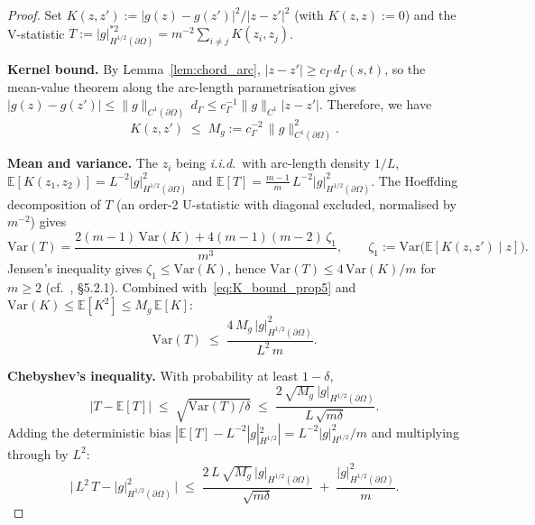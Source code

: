 \documentclass[11pt]{article}
\begin{document}
\begin{proof} 
Set $K(z,z') := |g(z)-g(z')|^2/|z-z'|^2$ (with $K(z,z):=0$) and the
V-statistic
$T := |g|^{*2}_{H^{1/2}(\partial\Omega)}
= m^{-2}\sum_{i\ne j}K(z_i,z_j)$.
 
\smallskip\noindent\textbf{Kernel bound.}
By Lemma~\ref{lem:chord_arc}, $|z-z'| \ge c_\Gamma\,d_\Gamma(s,t)$,
so the mean-value theorem along the arc-length parametrisation gives
$|g(z)-g(z')| \le \|g\|_{C^1(\partial\Omega)}\,d_\Gamma
\le c_\Gamma^{-1}\|g\|_{C^1}|z-z'|$. Therefore, we have
\begin{equation}\label{eq:K_bound_prop5}
  K(z,z') \;\le\; M_g := c_\Gamma^{-2}\,\|g\|^2_{C^1(\partial\Omega)}.
\end{equation}
 
\smallskip\noindent\textbf{Mean and variance.}
The $z_i$ being {\em i.i.d.}\ with arc-length density $1/L$,
$\mathbb{E}[K(z_1,z_2)] = L^{-2}|g|^2_{H^{1/2}(\partial\Omega)}$ and
$\mathbb{E}[T] = \tfrac{m-1}{m}\,L^{-2}|g|^2_{H^{1/2}(\partial\Omega)}$.
The Hoeffding decomposition of $T$ (an order-2 U-statistic with
diagonal excluded, normalised by $m^{-2}$) gives
\[
  \mathrm{Var}(T)
  = \frac{2(m-1)\,\mathrm{Var}(K) + 4(m-1)(m-2)\,\zeta_1}{m^3},
  \qquad
  \zeta_1 := \mathrm{Var}\!\bigl(\mathbb{E}[K(z,z')\mid z]\bigr).
\]
Jensen's inequality gives $\zeta_1 \le \mathrm{Var}(K)$, hence
$\mathrm{Var}(T) \le 4\,\mathrm{Var}(K)/m$ for $m \ge 2$
(cf.~\cite{serfling1980}, \S5.2.1). Combined with~\eqref{eq:K_bound_prop5}
and $\mathrm{Var}(K) \le \mathbb{E}[K^2] \le M_g\,\mathbb{E}[K]$:
\begin{equation}\label{eq:var_T_prop5}
  \mathrm{Var}(T)
  \;\le\;
  \frac{4\,M_g\,|g|^2_{H^{1/2}(\partial\Omega)}}{L^2\,m}.
\end{equation}
 
\smallskip\noindent\textbf{Chebyshev's inequality.}
With probability at least $1-\delta$,
\[
  |T - \mathbb{E}[T]|
  \;\le\; \sqrt{\mathrm{Var}(T)/\delta}
  \;\le\; \frac{2\,\sqrt{M_g}\,|g|_{H^{1/2}(\partial\Omega)}}
              {L\,\sqrt{m\delta}}.
\]
Adding the deterministic bias
$|\mathbb{E}[T] - L^{-2}|g|^2_{H^{1/2}}| = L^{-2}|g|^2_{H^{1/2}}/m$
and multiplying through by $L^2$:
\begin{equation}\label{eq:T_sq_almost_prop5}
  \bigl|\,L^2\,T - |g|^2_{H^{1/2}(\partial\Omega)}\,\bigr|
  \;\le\;
  \frac{2\,L\,\sqrt{M_g}\,|g|_{H^{1/2}(\partial\Omega)}}{\sqrt{m\delta}}
  \;+\;
  \frac{|g|^2_{H^{1/2}(\partial\Omega)}}{m}.
\end{equation}
 

\end{proof}
\end{document}
